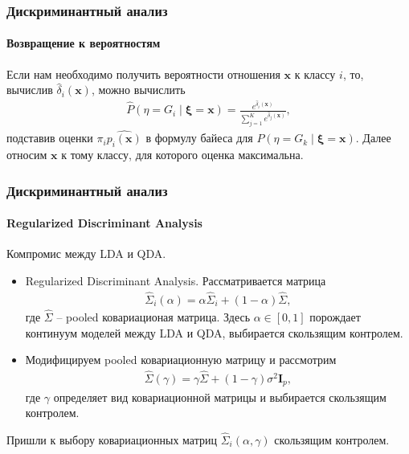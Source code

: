 \documentclass{beamer}
\begin{document}
\begin{frame}
  \frametitle{Дискриминантный анализ}
  \framesubtitle{Возвращение к вероятностям}
  Если нам необходимо получить вероятности отношения $\mathbf{x}$ к классу $i$, то, вычислив $\widehat{\delta}_i(\mathbf{x})$, можно вычислить
  \begin{align*}
    \widehat{P}(\eta = G_i \mid \boldsymbol{\xi} = \mathbf{x}) = \frac{e^{\widehat{\delta}_i(\mathbf{x})}}{\sum\limits_{j = 1}^K e^{\widehat{\delta}_j(\mathbf{x})}},
  \end{align*}
  подставив оценки $\pi_i \widehat{p_i(\mathbf{x})}$ в формулу байеса для $ P(\eta = G_k \mid \boldsymbol{\xi} = \mathbf{x})$. Далее относим $\mathbf{x}$ к тому классу, для которого оценка максимальна.
\end{frame}
\begin{frame}
  \frametitle{Дискриминантный анализ}
  \framesubtitle{Regularized Discriminant Analysis}
  Компромис между LDA и QDA.
  \begin{itemize}
    \item Regularized Discriminant Analysis. Рассматривается матрица
    \begin{align*}
       \widehat{\Sigma}_i(\alpha) = \alpha \widehat{\Sigma}_i + (1 - \alpha)\widehat{\Sigma},
    \end{align*}
    где $\widehat{\Sigma}$ -- pooled ковариационая матрица. Здесь $\alpha \in [0, 1]$ порождает континуум моделей между LDA и QDA, выбирается скользящим контролем.
    \bigskip
    \item  Модифицируем pooled ковариационную матрицу и рассмотрим
    \begin{align*}
       \widehat{\Sigma}(\gamma) = \gamma \widehat{\Sigma} + (1 - \gamma)\sigma^2 \mathbf{I}_p,
    \end{align*}
    где $\gamma$ определяет вид ковариационной матрицы и выбирается скользящим контролем.
  \end{itemize}

Пришли к выбору ковариационных матриц $\widehat{\Sigma}_i(\alpha, \gamma)$ скользящим контролем.
\end{frame}
\end{document}
